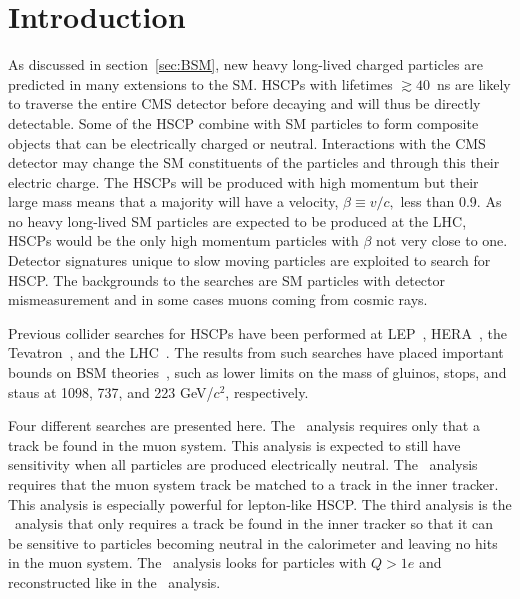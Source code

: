 \section{Introduction}
As discussed in section~\ref{sec:BSM}, new heavy long-lived charged particles are predicted in many extensions to the SM. HSCPs with
lifetimes $\gtrsim 40$~ns are likely to traverse the entire CMS detector before decaying and will thus be directly detectable.
Some of the HSCP combine with SM particles to form composite objects that can be electrically charged or neutral.
Interactions with the CMS detector may change the SM constituents of the particles and through this their electric charge.
The HSCPs will be produced with high momentum but their large mass means that
a majority will have a velocity, $\beta \equiv v/c,$ less than 0.9. 
As no heavy long-lived SM particles are expected to be produced at the LHC, HSCPs would be the only high momentum particles with $\beta$ not very close to one.
Detector signatures unique to slow moving particles are exploited to search for HSCP. 
The backgrounds to the searches are SM particles with detector mismeasurement and in some cases
muons coming from cosmic rays.

Previous collider searches for HSCPs have been performed at LEP~\cite{Barate:1997dr, Abreu:2000tn, Achard:2001qw, Abbiendi:2003yd}, HERA~\cite{Aktas:2004pq},
the Tevatron~\cite{Abazov:2008qu, Aaltonen:2009kea, Abazov:2011pf,Abazov:2012ab},
and the LHC~\cite{Khachatryan:2011ts, Aad:2011mb,  Aad:2011yf, Aad:2011hz, Chatrchyan::2012dr, Chatrchyan:2012sp, Aad:2012vd, ATLASmCHAMPs}.
The results from such searches have placed important bounds on BSM theories~\cite{Berger:2008cq, CahillRowley:2012kx}, such as lower limits on the
mass of gluinos, stops, and staus at 1098,
737, and 223 GeV/$c^2$, respectively.

Four different searches are presented here. The \muononly\ analysis requires only that a track be found in the muon system.
This analysis is expected to still have sensitivity when all particles are produced electrically neutral. The
\tktof\ analysis requires that the muon system track be matched to a track in the inner tracker. This analysis is especially
powerful for lepton-like HSCP. The third analysis is the \tkonly\ analysis that only requires a track be found in the inner tracker so that it can be sensitive to particles
becoming neutral in the calorimeter and leaving no hits in the muon system. The \multi\ analysis looks 
for particles with $Q > 1e$ and reconstructed like in the \tktof\ analysis.

